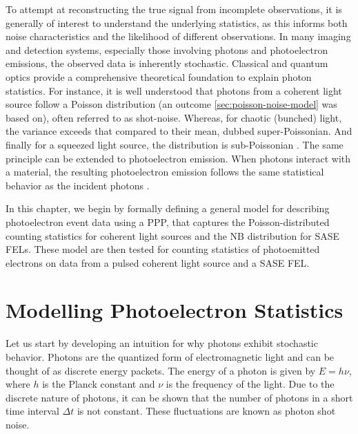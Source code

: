 To attempt at reconstructing the true signal from incomplete observations, it is generally of interest to understand the underlying statistics, as this informs both noise characteristics and the likelihood of different observations. In many imaging and detection systems, especially those involving photons and photoelectron emissions, the observed data is inherently stochastic. Classical and quantum optics provide a comprehensive theoretical foundation to explain photon statistics. For instance, it is well understood that photons from a coherent light source follow a Poisson distribution (an outcome \cref{sec:poisson-noise-model} was based on), often referred to as shot-noise. Whereas, for chaotic (bunched) light, the variance exceeds that compared to their mean, dubbed super-Poissonian. And finally for a squeezed light source, the distribution is sub-Poissonian \cite[Chapter~5]{foxQuantumOpticsIntroduction2006}. The same principle can be extended to photoelectron emission. When photons interact with a material, the resulting photoelectron emission follows the same statistical behavior as the incident photons \cite{mandelFluctuationsPhotonBeams1958,mandelFluctuationsPhotonBeams1959}. 

In this chapter, we begin by formally defining a general model for describing photoelectron event data using a \gls{PPP}, that captures the Poisson-distributed counting statistics for coherent light sources and the \gls{NB} distribution for \gls{SASE} \glspl{FEL}. These model are then tested for counting statistics of photoemitted electrons on data from a pulsed coherent light source and a \gls{SASE} \gls{FEL}.

\section{Modelling Photoelectron Statistics}\label{section:photoelectron-counting-stats}
Let us start by developing an intuition for why photons exhibit stochastic behavior. Photons are the quantized form of electromagnetic light and can be thought of as discrete energy packets. The energy of a photon is given by $E = h\nu$, where $h$ is the Planck constant and $\nu$ is the frequency of the light. Due to the discrete nature of photons, it can be shown that the number of photons in a short time interval $\Delta t$ is not constant. These fluctuations are known as photon shot noise.

